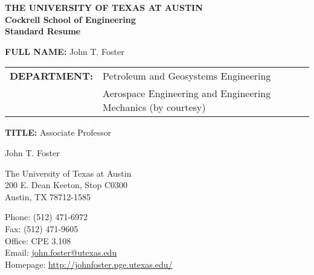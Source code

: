 \documentclass[12pt,letterpaper]{article}
\makeatletter
\let\saved@bibitem\@bibitem %
\def\HCode#1{}
\def\name{John T. Foster}
\makeatother
\begin{document}
\sloppy

\begingroup
\makeatletter
\let\@bibitem\saved@bibitem %
\endgroup

\ifdefined\iscockrell
\begin{center}
    \textbf{THE UNIVERSITY OF TEXAS AT AUSTIN \\ Cockrell School of Engineering \\ Standard Resume}
\end{center}

\bigskip

\begin{minipage}[t]{0.7\textwidth}
    \textbf{\large FULL NAME:} John T. Foster \\

    \begin{tabular}{@{}ll}
        \textbf{\large DEPARTMENT:} & Petroleum and Geosystems Engineering \\
        & Aerospace Engineering and Engineering Mechanics (by courtesy)
    \end{tabular}
\end{minipage}
\begin{minipage}[t]{0.3\textwidth}
    \textbf{\large TITLE:} Associate Professor
\end{minipage}
\else
\HCode{<div class="fluid-container"}

\HCode{<div class="row">}
\HCode{<div class="col-md-12">}
\HCode{<h1>}
{\huge \name}
\HCode{</h1>}
\HCode{</div>} %
\HCode{</div>} %

\bigskip

\HCode{<div class="row">}
\HCode{<div class="col-md-4">}
\begin{minipage}[t]{0.5\textwidth}
  The University of Texas at Austin \\
  200 E. Dean Keeton, Stop C0300 \\
  Austin, TX 78712-1585 \\
\end{minipage}
\HCode{</div>} %
\HCode{<div class="col-md-8">}
\begin{minipage}[t]{0.5\textwidth}
  Phone: (512) 471-6972 \\
  Fax: (512) 471-9605 \\
  Office: CPE 3.108 \\
\ifdefined\ispdf
  Email: \href{mailto:john.foster@utexas.edu}{john.foster@utexas.edu} \\
\fi
  Homepage: \href{http://johnfoster.pge.utexas.edu/}{http://johnfoster.pge.utexas.edu/}
\end{minipage}
\HCode{</div>} %
\HCode{</div>} %
\end{document}
